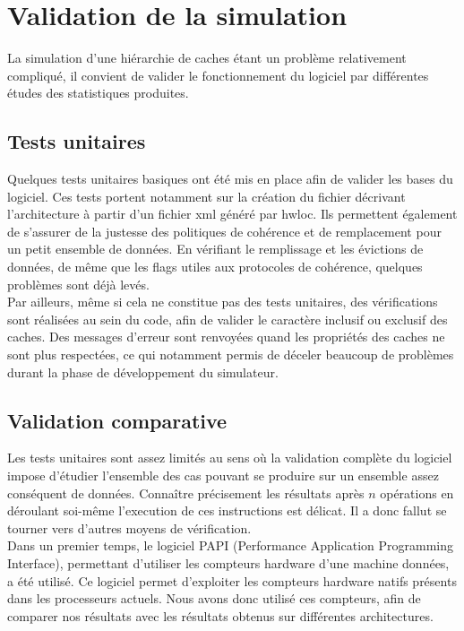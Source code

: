 \section{Validation de la simulation}

La simulation d'une hiérarchie de caches étant un problème relativement compliqué, il convient de valider le fonctionnement du logiciel par différentes études des statistiques produites.

\subsection{Tests unitaires}

Quelques tests unitaires basiques ont été mis en place afin de valider les bases du logiciel. Ces tests portent notamment sur la création du fichier décrivant l'architecture à partir d'un fichier xml généré par hwloc. Ils permettent également de s'assurer de la justesse des politiques de cohérence et de remplacement pour un petit ensemble de données. En vérifiant le remplissage et les évictions de données, de même que les flags utiles aux protocoles de cohérence, quelques problèmes sont déjà levés. \\

Par ailleurs, même si cela ne constitue pas des tests unitaires, des vérifications sont réalisées au sein du code, afin de valider le caractère inclusif ou exclusif des caches. Des messages d'erreur sont renvoyées quand les propriétés des caches ne sont plus respectées, ce qui notamment permis de déceler beaucoup de problèmes durant la phase de développement du simulateur.

\subsection{Validation comparative}

Les tests unitaires sont assez limités au sens où la validation complète du logiciel impose d'étudier l'ensemble des cas pouvant se produire sur un ensemble assez conséquent de données. Connaître précisement les résultats après $n$ opérations en déroulant soi-même l'execution de ces instructions est délicat. Il a donc fallut se tourner vers d'autres moyens de vérification. \\

Dans un premier temps, le logiciel \textsf{PAPI} (Performance Application Programming Interface), permettant d'utiliser les compteurs hardware d'une machine données, a été utilisé. Ce logiciel permet d'exploiter les compteurs hardware natifs présents dans les processeurs actuels. Nous avons donc utilisé ces compteurs, afin de comparer nos résultats avec les résultats obtenus sur différentes architectures. \\

